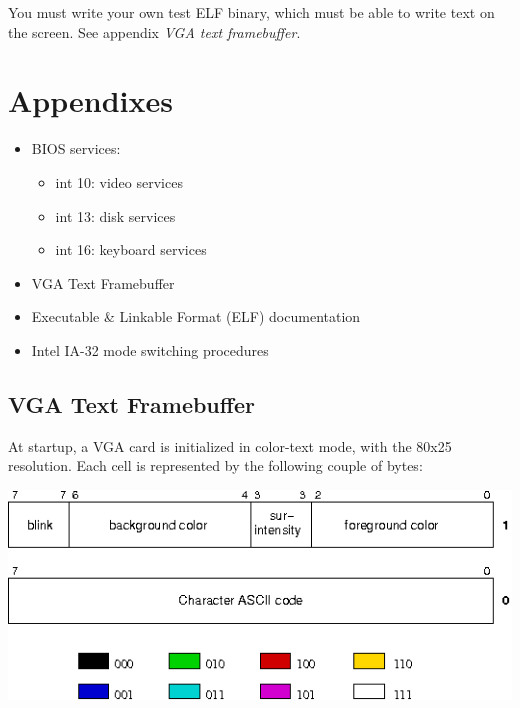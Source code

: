 You must write your own test ELF binary, which must be able to write
text on the screen. See appendix \emph{VGA text framebuffer}.

\newpage

\section{Appendixes}

\begin{itemize}
\item
  BIOS services:
  \begin{itemize}
  \item
    int 10: video services
  \item
    int 13: disk services
  \item
    int 16: keyboard services
  \end{itemize}
\item
  VGA Text Framebuffer
\item
  Executable \& Linkable Format (ELF) documentation
\item
  Intel IA-32 mode switching procedures
\end{itemize}

%
%
















%
%

\subsection*{VGA Text Framebuffer}

At startup, a VGA card is initialized in color-text mode, with the 80x25
resolution. Each cell is represented by the following couple of bytes:

\begin{center}
\includegraphics[width=\linewidth]{vga-text}
\end{center}

